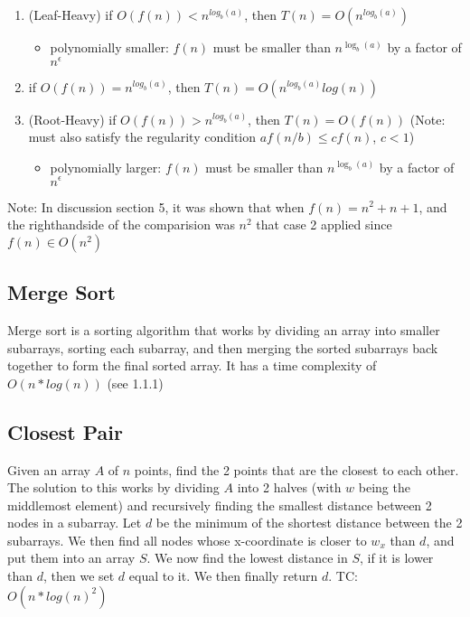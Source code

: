 \documentclass{article}
\begin{document}
\begin{enumerate}
    \item (Leaf-Heavy) if $O(f(n)) < n^{log_b(a)}$, then  $T(n) = O(n^{log_b(a)})$
    \begin{itemize}
        \item polynomially smaller: $f(n)$ must be smaller than $n^{\log_b(a)}$ by a factor of $n^{\epsilon}$
    \end{itemize}
    \item if $O(f(n)) = n^{log_b(a)}$, then $T(n) = O(n^{log_b(a)}log(n))$
    \item (Root-Heavy) if $O(f(n)) > n^{log_b(a)}$, then $T(n) = O(f(n))$ (Note: must also satisfy the regularity condition $af(n/b) \leq cf(n)$, $c < 1$)
    \begin{itemize}
        \item polynomially larger: $f(n)$ must be smaller than $n^{\log_b(a)}$ by a factor of $n^{\epsilon}$
    \end{itemize}
\end{enumerate}

Note: In discussion section 5, it was shown that when $f(n) = n^2+n+1$, and the righthandside of the comparision was
$n^2$ that case 2 applied since $f(n) \in O(n^2)$


\subsection{Merge Sort}
Merge sort is a sorting algorithm that works by dividing an array into smaller subarrays, sorting each subarray, and then merging the sorted subarrays back together to form the final sorted array. It has a time complexity of $O(n*log(n))$ (see 1.1.1)

\subsection{Closest Pair}
Given an array $A$ of $n$ points, find the 2 points that are the closest to each other. 
The solution to this works by dividing $A$ into 2 halves (with $w$ being the middlemost element) and recursively finding the smallest
distance between 2 nodes in a subarray. Let $d$ be the minimum of the shortest distance between
the 2 subarrays. We then find all nodes whose x-coordinate is closer to $w_x$ than $d$, and
put them into an array $S$. We now find the lowest distance in $S$, if it is lower than $d$, 
then we set $d$ equal to it. We then finally return $d$. TC: $O(n*log(n)^2)$
\end{document}
